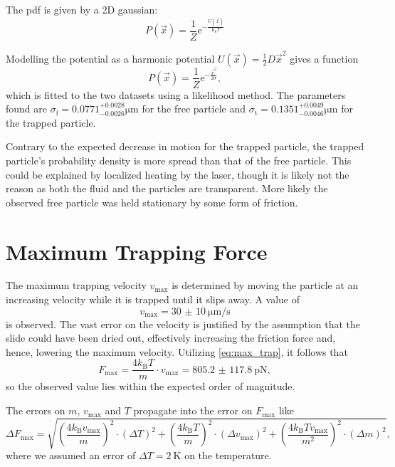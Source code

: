 The pdf is given by a 2D gaussian:
\begin{equation*}
	P(\vec{x}) = \frac{1}{Z} \text{e}^{-\frac{U(\vec{x})}{\text{k}_\text{b} T}}
\end{equation*}

Modelling the potential as a harmonic potential $U(\vec{x}) = \frac{1}{2} D \vec{x}^2$ gives a function
\begin{equation}
	P(\vec{x}) = \frac{1}{Z} \text{e}^{-\frac{\vec{x}^2}{2 \sigma}},
\end{equation}
which is fitted to the two datasets using a likelihood method.
The parameters found are $\sigma_\text{f} = \num{0.0771}^{+0.0028}_{-0.0026}\si{\um}$ for the free particle and $\sigma_\text{t} = \num{0.1351}^{+0.0049}_{-0.0046}\si{\um}$ for the trapped particle.

Contrary to the expected decrease in motion for the trapped particle, the trapped particle's probability density is more spread than that of the free particle.
This could be explained by localized heating by the laser, though it is likely not the reason as both the fluid and the particles are transparent.
More likely the observed free particle was held stationary by some form of friction.

\section{Maximum Trapping Force}
The maximum trapping velocity $v_\text{max}$ is determined by moving the particle at an increasing velocity while it is trapped until it slips away.
A value of
\begin{equation*}
	v_\text{max} = \SI{30(10)}{\micro\meter\per\second}
\end{equation*}
is observed.
The vast error on the velocity is justified by the assumption that the slide could have been dried out, effectively increasing the friction force and, hence, lowering the maximum velocity.
Utilizing \autoref{eq:max_trap}, it follows that
\begin{equation*}
	F_\text{max} = \frac{4k_\text{B}T}{m}\cdot v_\text{max} = \SI{805.2(1178)}{\pico\newton},	%
\end{equation*}
so the observed value lies within the expected order of magnitude.

The errors on $m$, $v_\text{max}$ and $T$ propagate into the error on $F_\text{max}$ like
\begin{equation*}
	\Delta F_\text{max} = \sqrt{\left(\frac{4k_\text{B}v_\text{max}}{m}\right)^2\cdot\left(\Delta T\right)^2 + \left(\frac{4k_\text{B}T}{m}\right)^2\cdot\left(\Delta v_\text{max}\right)^2 + \left(\frac{4k_\text{B}Tv_\text{max}}{m^2}\right)^2\cdot\left(\Delta m\right)^2},
\end{equation*}
where we assumed an error of $\Delta T = \SI{2}{\kelvin}$ on the temperature.

